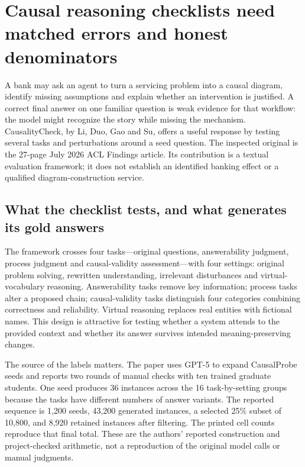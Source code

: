 \section{Causal reasoning checklists need matched errors and honest denominators}
\label{exec21:check-scope}
A bank may ask an agent to turn a servicing problem into a causal diagram, identify missing assumptions and explain whether an intervention is justified. A correct final answer on one familiar question is weak evidence for that workflow: the model might recognize the story while missing the mechanism. CausalityCheck, by Li, Duo, Gao and Su, offers a useful response by testing several tasks and perturbations around a seed question. The inspected original is the 27-page July 2026 ACL Findings article. Its contribution is a textual evaluation framework; it does not establish an identified banking effect or a qualified diagram-construction service.~\citep{exec21_causalitycheck}

\subsection{What the checklist tests, and what generates its gold answers}
\label{exec21:check-design}
The framework crosses four tasks---original questions, answerability judgment, process judgment and causal-validity assessment---with four settings: original problem solving, rewritten understanding, irrelevant disturbances and virtual-vocabulary reasoning. Answerability tasks remove key information; process tasks alter a proposed chain; causal-validity tasks distinguish four categories combining correctness and reliability. Virtual reasoning replaces real entities with fictional names. This design is attractive for testing whether a system attends to the provided context and whether its answer survives intended meaning-preserving changes.~\citep{exec21_causalitycheck}

The source of the labels matters. The paper uses GPT-5 to expand CausalProbe seeds and reports two rounds of manual checks with ten trained graduate students. One seed produces 36 instances across the 16 task-by-setting groups because the tasks have different numbers of answer variants. The reported sequence is 1,200 seeds, 43,200 generated instances, a selected 25\% subset of 10,800, and 8,920 retained instances after filtering. The printed cell counts reproduce that final total. These are the authors' reported construction and project-checked arithmetic, not a reproduction of the original model calls or manual judgments.~\citep{exec21_causalitycheck,exec21_causalitycheck_reference}

